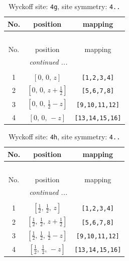 \documentclass[fleqn,8pt]{jsarticle}
\begin{document}
\renewcommand{\arraystretch}{1.2}
\begin{longtable}{ccc}
\caption{Wyckoff site: {\tt 4g}, site symmetry: {\tt 4..}}
 \\
 \hline \hline
No. & position & mapping \\ \hline \endfirsthead

\multicolumn{2}{l}{\tablename\ \thetable{}} \\
 \hline \hline
No. & position & mapping \\ \hline \endhead

 \hline \hline
\multicolumn{2}{r}{\footnotesize\it continued ...} \\ \endfoot

 \hline \hline
\multicolumn{2}{r}{} \\ \endlastfoot

1 & $\left[ 0,\, 0,\, z \right]$ & {\tt [1,2,3,4]} \\ \hline
2 & $\left[ 0,\, 0,\, z + \frac{1}{2} \right]$ & {\tt [5,6,7,8]} \\ \hline
3 & $\left[ 0,\, 0,\, \frac{1}{2} - z \right]$ & {\tt [9,10,11,12]} \\ \hline
4 & $\left[ 0,\, 0,\, - z \right]$ & {\tt [13,14,15,16]} \\
\end{longtable}
\renewcommand{\arraystretch}{1.2}
\begin{longtable}{ccc}
\caption{Wyckoff site: {\tt 4h}, site symmetry: {\tt 4..}}
 \\
 \hline \hline
No. & position & mapping \\ \hline \endfirsthead

\multicolumn{2}{l}{\tablename\ \thetable{}} \\
 \hline \hline
No. & position & mapping \\ \hline \endhead

 \hline \hline
\multicolumn{2}{r}{\footnotesize\it continued ...} \\ \endfoot

 \hline \hline
\multicolumn{2}{r}{} \\ \endlastfoot

1 & $\left[ \frac{1}{2},\, \frac{1}{2},\, z \right]$ & {\tt [1,2,3,4]} \\ \hline
2 & $\left[ \frac{1}{2},\, \frac{1}{2},\, z + \frac{1}{2} \right]$ & {\tt [5,6,7,8]} \\ \hline
3 & $\left[ \frac{1}{2},\, \frac{1}{2},\, \frac{1}{2} - z \right]$ & {\tt [9,10,11,12]} \\ \hline
4 & $\left[ \frac{1}{2},\, \frac{1}{2},\, - z \right]$ & {\tt [13,14,15,16]} \\
\end{longtable}
\end{document}
